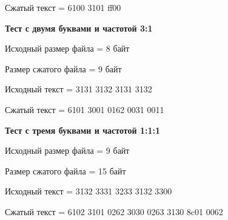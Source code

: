 Сжатый текст = 6100 3101 ff00

\textbf{Тест с двумя буквами и частотой 3:1}

Исходный размер файла = 8 байт

Размер сжатого файла = 9 байт

Исходный текст = 3131 3132 3131 3132

Сжатый текст = 6101 3001 0162 0031 0011

\textbf{Тест с тремя буквами и частотой 1:1:1}

Исходный размер файла = 9 байт

Размер сжатого файла = 15 байт

Исходный текст = 3132 3331 3233 3132 3300

Сжатый текст = 6102 3101 0262 3030 0263 3130 8c01 0062

